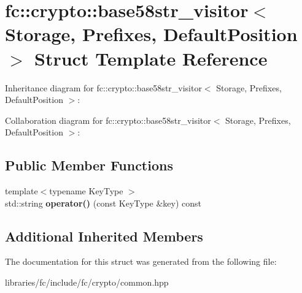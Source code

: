 \hypertarget{structfc_1_1crypto_1_1base58str__visitor}{}\section{fc\+:\+:crypto\+:\+:base58str\+\_\+visitor$<$ Storage, Prefixes, Default\+Position $>$ Struct Template Reference}
\label{structfc_1_1crypto_1_1base58str__visitor}


Inheritance diagram for fc\+:\+:crypto\+:\+:base58str\+\_\+visitor$<$ Storage, Prefixes, Default\+Position $>$\+:


Collaboration diagram for fc\+:\+:crypto\+:\+:base58str\+\_\+visitor$<$ Storage, Prefixes, Default\+Position $>$\+:
\subsection*{Public Member Functions}
\begin{DoxyCompactItemize}
\item 
\mbox{\label{structfc_1_1crypto_1_1base58str__visitor_af84d5fafb24c1c3590ca47296dd50612}} 
{\footnotesize template$<$typename Key\+Type $>$ }\\std\+::string {\bfseries operator()} (const Key\+Type \&key) const
\end{DoxyCompactItemize}
\subsection*{Additional Inherited Members}


The documentation for this struct was generated from the following file\+:\begin{DoxyCompactItemize}
\item 
libraries/fc/include/fc/crypto/common.\+hpp\end{DoxyCompactItemize}
